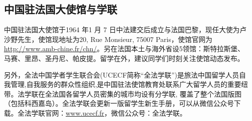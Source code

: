 \subsection{中国驻法国大使馆与学联}

中国驻法国大使馆于1964 年1 月 7 日中法建交后成立与法国巴黎，现任大使为卢沙野先生，使馆现地址为20, Rue Monsieur, 75007 Paris，使馆官网为\href{http://www.amb-chine.fr/chn/}{http://www.amb-chine.fr/chn/}。另在法国本土与海外省设5领馆：斯特拉斯堡、马赛、里昂、圣丹尼、帕皮提。留学在外，建议同学们时刻关注使馆动态发布。

另外，全法中国学者学生联合会(UCECF简称“全法学联”)是旅法中国留学人员自我管理,自我服务的群众性组织,是中国驻法使馆教育处联系广大留学人员的重要纽带。法学联在全法国各留学人员密集的城市均设有分学联, 覆盖了整个法国版图 （包括科西嘉岛）。全法学联会更新一版留学生新生手册，可以从微信公众号下载。全法学联官网：\href{www.ucecf.fr}{www.ucecf.fr}，微信公众号：全法学联。

